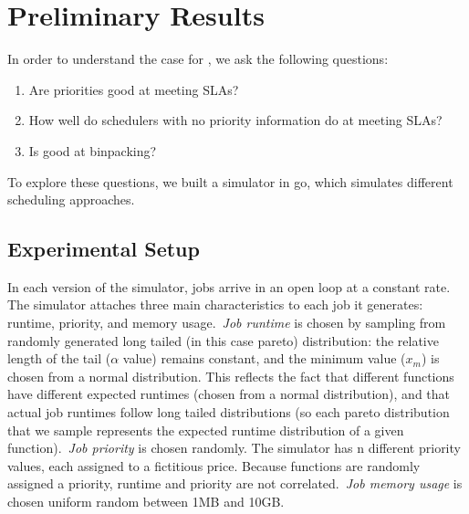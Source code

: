 \section{Preliminary Results}




In order to understand the case for \sys{}, we ask the following questions: 
\begin{enumerate}
    \item Are priorities good at meeting SLAs?
    \item How well do schedulers with no priority information do at meeting SLAs?
    \item Is \sys{} good at binpacking?
\end{enumerate}


To explore these questions, we built a simulator in go\cite{TODO}, which
simulates different scheduling approaches.


\subsection{Experimental Setup}

In each version of the simulator, jobs arrive in an open loop at a constant
rate. The simulator attaches three main characteristics to each job it
generates: runtime, priority, and memory usage.\ \textit{Job runtime} is chosen
by sampling from randomly generated long tailed (in this case pareto)
distribution: the relative length of the tail ($\alpha$ value) remains constant,
and the minimum value ($x_m$) is chosen from a normal distribution. This
reflects the fact that different functions have different expected runtimes
(chosen from a normal distribution), and that actual job runtimes follow long
tailed distributions (so each pareto distribution that we sample represents the
expected runtime distribution of a given function).\ \textit{Job priority} is
chosen randomly. The simulator has n different priority values, each assigned to
a fictitious price. Because functions are randomly assigned a priority, runtime
and priority are not correlated.\ \textit{Job memory usage} is chosen uniform
random between 1MB and 10GB.

